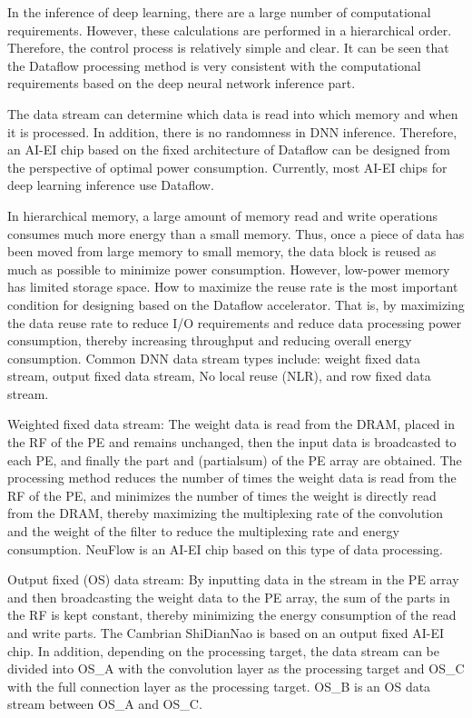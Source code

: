 \documentclass[UTF8,12pt,a4paper]{article}
\begin{document}
In the inference of deep learning, there are a large number of computational requirements.
However, these calculations are performed in a hierarchical order.
Therefore, the control process is relatively simple and clear.
It can be seen that the Dataflow processing method is very consistent
with the computational requirements based on the deep neural network inference part.

The data stream can determine which data is read into which memory and when it is processed.
In addition, there is no randomness in DNN inference.
Therefore, an AI-EI chip based on the fixed architecture of Dataflow
can be designed from the perspective of optimal power consumption.
Currently, most AI-EI chips for deep learning inference use Dataflow.

In hierarchical memory, a large amount of memory read and write operations
consumes much more energy than a small memory.
Thus, once a piece of data has been moved from large memory to small memory,
the data block is reused as much as possible to minimize power consumption.
However, low-power memory has limited storage space.
How to maximize the reuse rate is the most important condition
for designing based on the Dataflow accelerator.
That is, by maximizing the data reuse rate to reduce I/O requirements
and reduce data processing power consumption,
thereby increasing throughput and reducing overall energy consumption.
Common DNN data stream types include: weight fixed data stream, output fixed data stream, No local reuse (NLR), and row fixed data stream.

Weighted fixed data stream: The weight data is read from the DRAM,
placed in the RF of the PE and remains unchanged,
then the input data is broadcasted to each PE,
and finally the part and (partialsum) of the PE array are obtained.
The processing method reduces the number of times the weight data is read from the RF of the PE,
and minimizes the number of times the weight is directly read from the DRAM,
thereby maximizing the multiplexing rate of the convolution
and the weight of the filter to reduce the multiplexing rate and energy consumption.
NeuFlow is an AI-EI chip based on this type of data processing.

Output fixed (OS) data stream: By inputting data in the stream in the PE array
and then broadcasting the weight data to the PE array,
the sum of the parts in the RF is kept constant,
thereby minimizing the energy consumption of the read and write parts.
The Cambrian ShiDianNao is based on an output fixed AI-EI chip.
In addition, depending on the processing target,
the data stream can be divided into OS\_A with the convolution layer as the processing target
and OS\_C with the full connection layer as the processing target.
OS\_B is an OS data stream between OS\_A and OS\_C.
\end{document}
